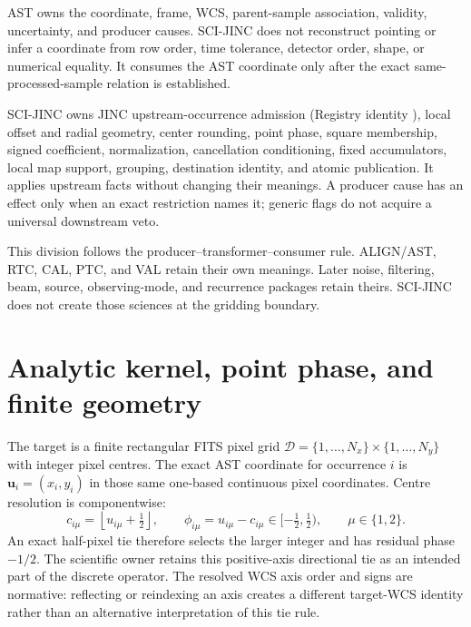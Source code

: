 \documentclass[11pt]{article}
\begin{document}
AST owns the coordinate, frame, WCS, parent-sample association, validity,
uncertainty, and producer causes.  SCI-JINC does not reconstruct pointing or
infer a coordinate from row order, time tolerance, detector order, shape, or
numerical equality.  It consumes the AST coordinate only after the exact
same-processed-sample relation is established.

SCI-JINC owns JINC upstream-occurrence admission (Registry identity
), local offset and radial
geometry, center rounding, point phase, square membership, signed coefficient,
normalization, cancellation conditioning, fixed accumulators, local map
support, grouping, destination identity, and atomic publication.  It applies
upstream facts without changing their meanings.  A producer cause has an
effect only when an exact restriction names it; generic flags do not acquire a
universal downstream veto.

This division follows the producer--transformer--consumer rule.  ALIGN/AST,
RTC, CAL, PTC, and VAL retain their own meanings.  Later noise, filtering,
beam, source, observing-mode, and recurrence packages retain theirs.  SCI-JINC
does not create those sciences at the gridding boundary.

\section{Analytic kernel, point phase, and finite geometry}
\label{sec:geometry-narrative}

The target is a finite rectangular FITS pixel grid
$\mathcal D=\{1,\ldots,N_x\}\mathbin{\times}\{1,\ldots,N_y\}$ with integer pixel
centres.  The exact AST coordinate for occurrence $i$ is
$\boldsymbol{u}_i=(x_i,y_i)$ in those same one-based
continuous pixel coordinates.  Centre resolution is componentwise:
\[
 c_{i\mu}=\left\lfloor u_{i\mu}+\tfrac12\right\rfloor,
 \qquad
 \phi_{i\mu}=u_{i\mu}-c_{i\mu}\in[-\tfrac12,\tfrac12),
 \qquad \mu\in\{1,2\}.
\]
An exact half-pixel tie therefore selects the larger integer and has residual
phase $-1/2$.  The scientific owner retains this positive-axis directional
tie as an intended part of the discrete operator.  The resolved WCS axis
order and signs are normative: reflecting
or reindexing an axis creates a different target-WCS identity rather than an
alternative interpretation of this tie rule.
\end{document}
